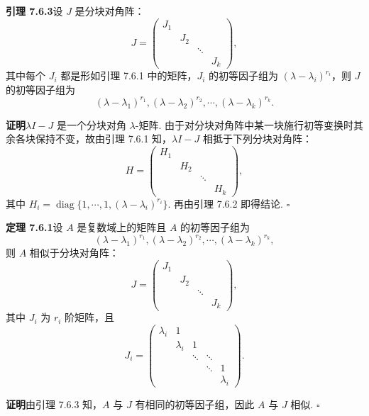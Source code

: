\documentclass[UTF8,12pt,a4paper,fontset=fandol]{ctexart}
\begin{document}
\noindent\textbf{引理 7.6.3}\quad 设 $J$ 是分块对角阵：
\[
J=\left(\begin{array}{cccc}
J_1 & & & \\
& J_2 & & \\
& & \ddots & \\
& & & J_k
\end{array}\right),
\]
其中每个 $J_i$ 都是形如引理 7.6.1 中的矩阵，$J_i$ 的初等因子组为 $(\lambda-\lambda_i)^{r_i}$，则 $J$ 的初等因子组为
\begin{equation}
(\lambda-\lambda_1)^{r_1},(\lambda-\lambda_2)^{r_2},\cdots,(\lambda-\lambda_k)^{r_k}.
\tag{7.6.3}
\end{equation}

\noindent\textbf{证明}\quad $\lambda I-J$ 是一个分块对角 $\lambda$-矩阵. 由于对分块对角阵中某一块施行初等变换时其余各块保持不变，故由引理 7.6.1 知，$\lambda I-J$ 相抵于下列分块对角阵：
\[
H=\left(\begin{array}{cccc}
H_1 & & & \\
& H_2 & & \\
& & \ddots & \\
& & & H_k
\end{array}\right),
\]
其中 $H_i=\operatorname{diag}\{1,\cdots,1,(\lambda-\lambda_i)^{r_i}\}$. 再由引理 7.6.2 即得结论. $\square$

\noindent\textbf{定理 7.6.1}\quad 设 $A$ 是复数域上的矩阵且 $A$ 的初等因子组为
\[
(\lambda-\lambda_1)^{r_1},(\lambda-\lambda_2)^{r_2},\cdots,(\lambda-\lambda_k)^{r_k},
\]
则 $A$ 相似于分块对角阵：
\begin{equation}
J=\left(\begin{array}{cccc}
J_1 & & & \\
& J_2 & & \\
& & \ddots & \\
& & & J_k
\end{array}\right),
\tag{7.6.4}
\end{equation}
其中 $J_i$ 为 $r_i$ 阶矩阵，且
\begin{equation}
J_i=\left(\begin{array}{ccccc}
\lambda_i & 1 & & & \\
& \lambda_i & 1 & & \\
& & \ddots & \ddots & \\
& & & \ddots & 1\\
& & & & \lambda_i
\end{array}\right).
\tag{7.6.5}
\end{equation}

\noindent\textbf{证明}\quad 由引理 7.6.3 知，$A$ 与 $J$ 有相同的初等因子组，因此 $A$ 与 $J$ 相似. $\square$
\end{document}
